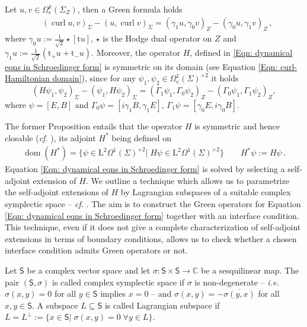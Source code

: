 \begin{proposition}\label{Prop: Curl and H Green formula}
	Let $u,v\in \Omega^k_\mathrm{c}(\Sigma_Z)$, then a Green formula holds
	\begin{align}\label{Eqn: Green curl}
	&(\operatorname{curl}u,v)_\Sigma-(u,\operatorname{curl}v)_\Sigma=
	(\gamma_1u,\gamma_0v)_Z-(\gamma_0u,\gamma_1v)_Z\,,
	\end{align}
	where $\gamma_0u:=\frac{1}{\sqrt{2}}\star[\mathrm{t}u]$, $\star$ is the Hodge dual operator on $Z$ and
	$\gamma_1u:=\frac{1}{\sqrt{2}}(\mathrm{t}_+u+\mathrm{t}_-u)$. Moreover, the operator $H$, defined in \eqref{Eqn: dynamical eqns in Schroedinger form} is symmetric on its domain (see Equation \eqref{Eqn: curl-Hamiltonian domain}), since for any $\psi_1,\psi_2\in \Omega_\mathrm{c}^1(\Sigma)^{\times 2}$ it holds
	\begin{equation}\label{Eqn: Green H}
		(H\psi_1,\psi_2)_\Sigma-(\psi_1,H\psi_2)_\Sigma=(\Gamma_1\psi_1,\Gamma_0\psi_2)_Z-(\Gamma_0\psi_1,\Gamma_1\psi_2)_Z,
	\end{equation}
	where $\psi=[E,B]$ and $\Gamma_0\psi=\left[i\gamma_1 B,\gamma_1 E\right]$, $\Gamma_1\psi=\left[\gamma_0 E,i\gamma_0 B\right]$.
\end{proposition}
\noindent The former Proposition entails that the operator $H$ is symmetric and hence closable (\emph{cf.} \parencite[Thm. 5.10]{Moretti-18}), its adjoint $H^*$ being defined on
\begin{align}\label{Eqn: adjoint curl-Hamiltonian}
	\operatorname{dom}(H^*)=\lbrace
	\psi\in\mathrm{L}^2\Omega^1(\Sigma)^{\times 2}|\;H\psi\in\mathrm{L}^2\Omega^1(\Sigma)^{\times 2}\rbrace\qquad
	H^*\psi:=H\psi\,.
\end{align}
Equation \eqref{Eqn: dynamical eqns in Schroedinger form} is solved by selecting a self-adjoint extension of $H$.
We outline a technique which allows us to parametrize the self-adjoint extensions of $H$ by Lagrangian subspaces of a suitable complex symplectic space -- \emph{cf.} \parencite{Everitt-Markus-99,Everitt-Markus-03,Everitt-Markus-05}. The aim is to construct the Green operators for Equation \eqref{Eqn: dynamical eqns in Schroedinger form} together with an interface condition. This technique, even if it does not give a complete characterization of self-adjoint extensions in terms of boundary conditions, allows us to check whether a chosen interface condition admits Green operators or not.
\begin{Definition}\label{Def: complex symplectic space, Lagrangian subspaces}
	Let $\mathsf{S}$ be a complex vector space and let $\sigma\colon\mathsf{S}\times\mathsf{S}\to\mathbb{C}$ be a sesquilinear map.
	The pair $(\mathsf{S},\sigma)$ is called complex symplectic space if $\sigma$ is non-degenerate -- \textit{i.e.} $\sigma(x,y)=0$ for all $y\in\mathsf{S}$ implies $x=0$ -- and $\sigma(x,y)=-\overline{\sigma(y,x)}$ for all $x,y\in\mathsf{S}$.
	A subspace $L\subseteq\mathsf{S}$ is called Lagrangian subspace if $L=L^\perp:=\lbrace x\in\mathsf{S}|\;\sigma(x,y)=0\;\forall y\in L\rbrace$.
\end{Definition}
